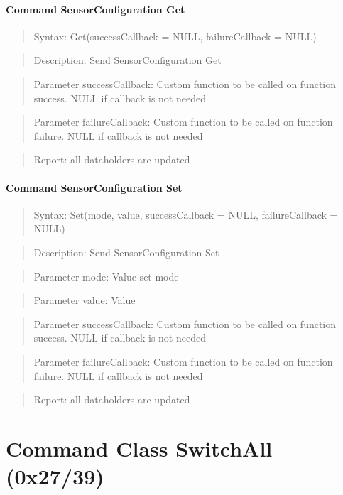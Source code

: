 \paragraph{Command SensorConfiguration Get}
\begin{quote}Syntax: Get(successCallback = NULL, failureCallback = NULL)\end{quote}
\begin{quote}Description: Send SensorConfiguration Get\end{quote}
\begin{quote}Parameter successCallback: Custom function to be called on function success. NULL if callback is not needed\end{quote}
\begin{quote}Parameter failureCallback: Custom function to be called on function failure. NULL if callback is not needed\end{quote}
\begin{quote}Report: all dataholders are updated\end{quote}

\paragraph{Command SensorConfiguration Set}
\begin{quote}Syntax: Set(mode, value, successCallback = NULL, failureCallback = NULL)\end{quote}
\begin{quote}Description: Send SensorConfiguration Set\end{quote}
\begin{quote}Parameter mode: Value set mode\end{quote}
\begin{quote}Parameter value: Value\end{quote}
\begin{quote}Parameter successCallback: Custom function to be called on function success. NULL if callback is not needed\end{quote}
\begin{quote}Parameter failureCallback: Custom function to be called on function failure. NULL if callback is not needed\end{quote}
\begin{quote}Report: all dataholders are updated\end{quote}


\section{Command Class SwitchAll (0x27/39)}

